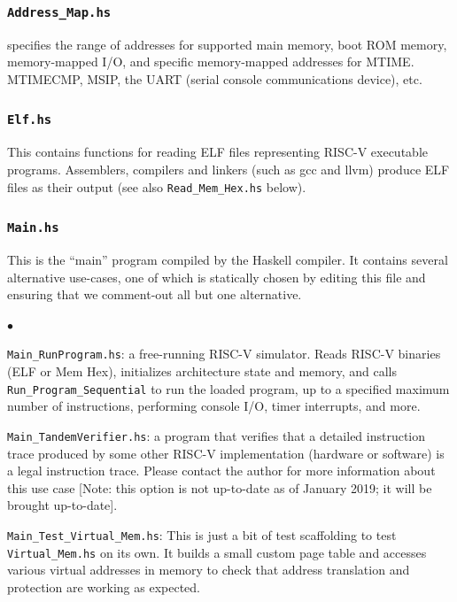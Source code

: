 \documentclass[11pt]{article}
\newenvironment{tightlist}%
{\begin{list}{$\bullet$}{%
    \setlength{\topsep}{0in}
    \setlength{\partopsep}{0in}
    \setlength{\itemsep}{0in}
    \setlength{\parsep}{0in}
    \setlength{\leftmargin}{1.5em}
    \setlength{\rightmargin}{0in}
    \setlength{\itemindent}{0in}
}
}%
{\end{list}
}
\begin{document}
\subsubsection{\tt Address\_Map.hs}

 specifies the range of addresses for supported
main memory, boot ROM memory, memory-mapped I/O, and specific
memory-mapped addresses for MTIME. MTIMECMP, MSIP, the UART (serial
console communications device), etc.


\subsubsection{\tt Elf.hs}

This contains functions for reading ELF files representing RISC-V
executable programs.  Assemblers, compilers and linkers (such as gcc
and llvm) produce ELF files as their output (see also
\verb|Read_Mem_Hex.hs| below).


\subsubsection{\tt Main.hs}

This is the ``main'' program compiled by the Haskell compiler.  It
contains several alternative use-cases, one of which is statically
chosen by editing this file and ensuring that we comment-out all but
one alternative.

\begin{tightlist}

\item \verb|Main_RunProgram.hs|: a free-running RISC-V simulator.
Reads RISC-V binaries (ELF or Mem Hex), initializes architecture state
and memory, and calls \verb|Run_Program_Sequential| to run the loaded
program, up to a specified maximum number of instructions, performing
console I/O, timer interrupts, and more.

\item \verb|Main_TandemVerifier.hs|: a program that verifies that a
detailed instruction trace produced by some other RISC-V
implementation (hardware or software) is a legal instruction trace.
Please contact the author for more information about this use case
[Note: this option is not up-to-date as of January 2019; it will be
brought up-to-date].

\item \verb|Main_Test_Virtual_Mem.hs|: This is just a bit of test
scaffolding to test \verb|Virtual_Mem.hs| on its own.  It builds a
small custom page table and accesses various virtual addresses in
memory to check that address translation and protection are working as
expected.

\end{tightlist}
\end{document}
